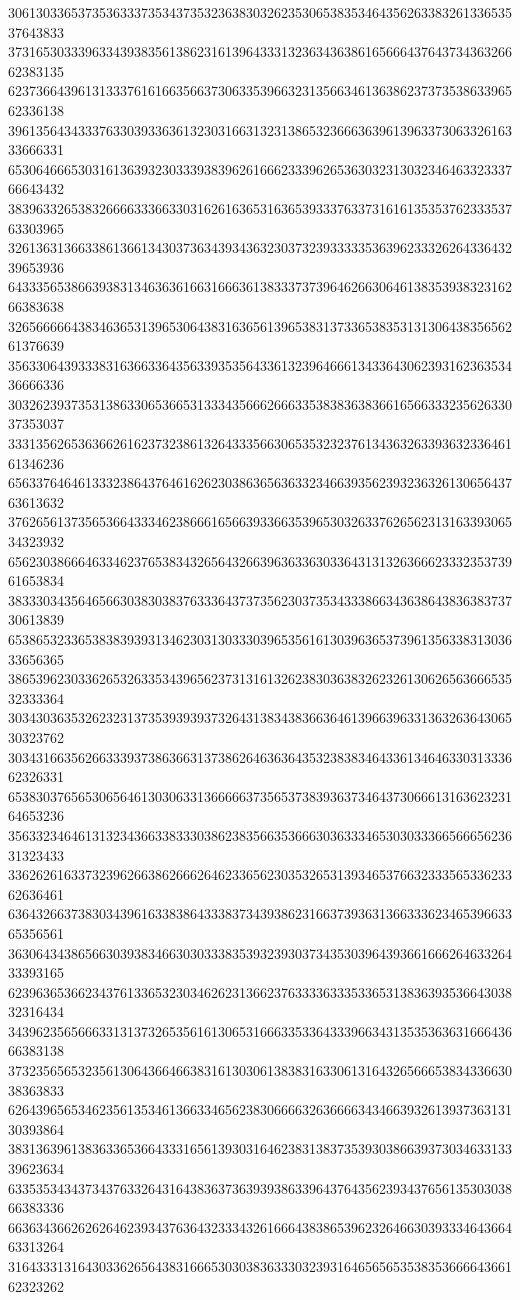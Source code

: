 30613033653735363337353437353236383032623530653835346435626338326133653537643833
37316530333963343938356138623161396433313236343638616566643764373436326662383135
62373664396131333761616635663730633539663231356634613638623737353863396562336138
39613564343337633039336361323031663132313865323666363961396337306332616333666331
65306466653031613639323033393839626166623339626536303231303234646332333766643432
38396332653832666633366330316261636531636539333763373161613535376233353763303965
32613631366338613661343037363439343632303732393333353639623332626433643239653936
64333565386639383134636361663166636138333737396462663064613835393832316266383638
32656666643834636531396530643831636561396538313733653835313130643835656261376639
35633064393338316366336435633935356433613239646661343364306239316236353436666336
30326239373531386330653665313334356662666335383836383661656633323562633037353037
33313562653636626162373238613264333566306535323237613436326339363233646161346236
65633764646133323864376461626230386365636332346639356239323632613065643763613632
37626561373565366433346238666165663933663539653032633762656231316339306534323932
65623038666463346237653834326564326639636336303364313132636662333235373961653834
38333034356465663038303837633364373735623037353433386634363864383638373730613839
65386532336538383939313462303130333039653561613039636537396135633831303633656365
38653962303362653263353439656237313161326238303638326232613062656366653532333364
30343036353262323137353939393732643138343836636461396639633136326364306530323762
30343166356266333937386366313738626463636435323838346433613464633031333662326331
65383037656530656461303063313666663735653738393637346437306661316362323164653236
35633234646131323436633833303862383566353666303633346530303336656665623631323433
33626261633732396266386266626462336562303532653139346537663233356533623362636461
63643266373830343961633838643338373439386231663739363136633362346539663365356561
36306434386566303938346630303338353932393037343530396439366166626463326433393165
62396365366234376133653230346262313662376333363335336531383639353664303832316434
34396235656663313137326535616130653166633533643339663431353536363166643666383138
37323565653235613064366466383161303061383831633061316432656665383433663038363833
62643965653462356135346136633465623830666632636666343466393261393736313130393864
38313639613836336536643331656139303164623831383735393038663937303463313339623634
63353534343734376332643164383637363939386339643764356239343765613530303866383336
66363436626262646239343763643233343261666438386539623264663039333464366463313264
31643331316430336265643831666530303836333032393164656565353835366664366162323262
